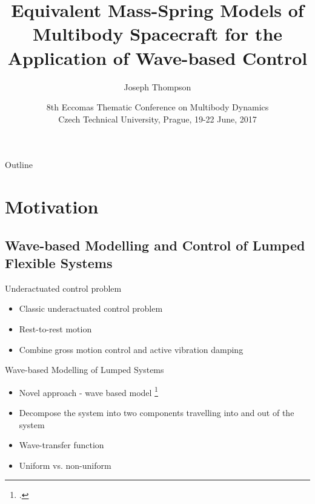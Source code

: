 \documentclass{beamer}
\title[Equivalent Mass-Spring Models]{Equivalent Mass-Spring Models of Multibody Spacecraft for the Application of Wave-based Control}
\author{Joseph Thompson} %
\institute[UCD, Ireland]{University College Dublin, Ireland}
\date[ECCOMAS MBD 2017] %
{8th Eccomas Thematic Conference on Multibody Dynamics \\ \vspace{8pt} \small{Czech Technical University, Prague, 19-22 June, 2017}}
\begin{document}
\begin{frame}
  \titlepage
\end{frame}
\begin{frame}{Outline}
  \tableofcontents
\end{frame}

\section{Motivation}

\subsection{Wave-based Modelling and Control of Lumped Flexible Systems}

\begin{frame}{Underactuated control problem}
\begin{itemize}
\item Classic underactuated control problem
\item Rest-to-rest motion
\item Combine gross motion control and active vibration damping
\end{itemize}
\end{frame}

\begin{frame}{Wave-based Modelling of Lumped Systems}
\begin{itemize}
\item Novel approach - wave based model \footcite{OConnor2011}
\item Decompose the system into two components travelling into and out of the system
\item Wave-transfer function
\item Uniform vs. non-uniform
\end{itemize}
\end{frame}
\end{document}
